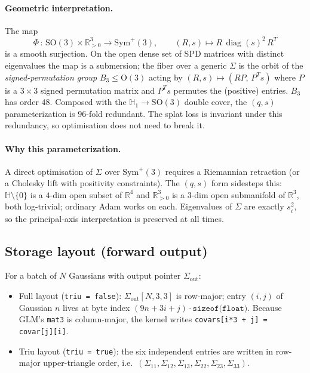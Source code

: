 \documentclass[11pt]{article}
\newcommand{\SO}{\mathrm{SO}}
\newcommand{\SymPos}{\mathrm{Sym}^{+}}
\newcommand{\diag}{\operatorname{diag}}
\newcommand{\R}{\mathbb{R}}
\newcommand{\HQ}{\mathbb{H}}
\begin{document}
\paragraph{Geometric interpretation.}
The map
\begin{equation}
  \Phi \,\colon\, \SO(3) \times \R^{3}_{>0} \longrightarrow \SymPos(3),
  \qquad (R, s) \longmapsto R\, \diag(s)^{2}\, R^{T}
\end{equation}
is a smooth surjection. On the open dense set of SPD matrices with
distinct eigenvalues the map is a submersion; the fiber over a generic
$\Sigma$ is the orbit of the \emph{signed-permutation group}
$B_{3} \le \mathrm{O}(3)$ acting by
$(R, s) \mapsto (R P,\, P^{T} s)$ where $P$ is a $3 \times 3$ signed
permutation matrix and $P^{T} s$ permutes the (positive) entries.
$B_{3}$ has order $48$. Composed with the $\HQ_{1} \to \SO(3)$ double
cover, the $(q, s)$ parameterization is $96$-fold redundant. The
splat loss is invariant under this redundancy, so optimisation does
not need to break it.

\paragraph{Why this parameterization.}
A direct optimisation of $\Sigma$ over $\SymPos(3)$ requires a
Riemannian retraction (or a Cholesky lift with positivity
constraints). The $(q, s)$ form sidesteps this:
$\HQ \setminus \{0\}$ is a $4$-dim open subset of $\R^{4}$ and
$\R^{3}_{>0}$ is a $3$-dim open submanifold of $\R^{3}$, both
log-trivial; ordinary Adam works on each. Eigenvalues of $\Sigma$
are exactly $s_{i}^{2}$, so the principal-axis interpretation is
preserved at all times.

\subsection{Storage layout (forward output)}

For a batch of $N$ Gaussians with output pointer $\Sigma_{\text{out}}$:
\begin{itemize}
  \item Full layout (\texttt{triu = false}): $\Sigma_{\text{out}}[N, 3, 3]$
  is row-major; entry $(i, j)$ of Gaussian $n$ lives at byte index
  $(9n + 3i + j) \cdot \texttt{sizeof(float)}$. Because GLM's
  \texttt{mat3} is column-major, the kernel writes
  \texttt{covars[i*3 + j] = covar[j][i]}.
  \item Triu layout (\texttt{triu = true}): the six independent
  entries are written in row-major upper-triangle order, i.e.\
  $(\Sigma_{11}, \Sigma_{12}, \Sigma_{13}, \Sigma_{22}, \Sigma_{23}, \Sigma_{33})$.
\end{itemize}
\end{document}
